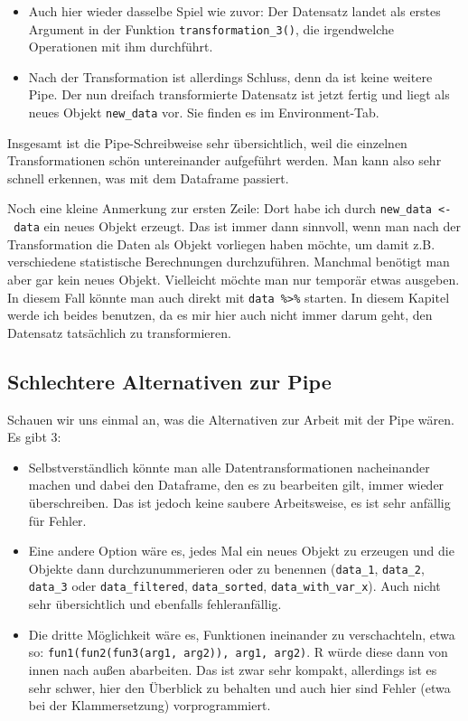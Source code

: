 \documentclass[
]{book}
\begin{document}
\begin{enumerate}
  \begin{itemize}
  \item
    Auch hier wieder dasselbe Spiel wie zuvor: Der Datensatz landet als erstes Argument in der Funktion \texttt{transformation\_3()}, die irgendwelche Operationen mit ihm durchführt.
  \item
    Nach der Transformation ist allerdings Schluss, denn da ist keine weitere Pipe. Der nun dreifach transformierte Datensatz ist jetzt fertig und liegt als neues Objekt \texttt{new\_data} vor. Sie finden es im Environment-Tab.
  \end{itemize}
\end{enumerate}

Insgesamt ist die Pipe-Schreibweise sehr übersichtlich, weil die einzelnen Transformationen schön untereinander aufgeführt werden. Man kann also sehr schnell erkennen, was mit dem Dataframe passiert.

Noch eine kleine Anmerkung zur ersten Zeile: Dort habe ich durch \texttt{new\_data\ \textless{}-\ data} ein neues Objekt erzeugt. Das ist immer dann sinnvoll, wenn man nach der Transformation die Daten als Objekt vorliegen haben möchte, um damit z.B. verschiedene statistische Berechnungen durchzuführen. Manchmal benötigt man aber gar kein neues Objekt. Vielleicht möchte man nur temporär etwas ausgeben. In diesem Fall könnte man auch direkt mit \texttt{data\ \%\textgreater{}\%} starten. In diesem Kapitel werde ich beides benutzen, da es mir hier auch nicht immer darum geht, den Datensatz tatsächlich zu transformieren.

\hypertarget{schlechtere-alternativen-zur-pipe}{%
\subsection{Schlechtere Alternativen zur Pipe}\label{schlechtere-alternativen-zur-pipe}}

Schauen wir uns einmal an, was die Alternativen zur Arbeit mit der Pipe wären. Es gibt 3:

\begin{itemize}
\item
  Selbstverständlich könnte man alle Datentransformationen nacheinander machen und dabei den Dataframe, den es zu bearbeiten gilt, immer wieder überschreiben. Das ist jedoch keine saubere Arbeitsweise, es ist sehr anfällig für Fehler.
\item
  Eine andere Option wäre es, jedes Mal ein neues Objekt zu erzeugen und die Objekte dann durchzunummerieren oder zu benennen (\texttt{data\_1}, \texttt{data\_2}, \texttt{data\_3} oder \texttt{data\_filtered}, \texttt{data\_sorted}, \texttt{data\_with\_var\_x}). Auch nicht sehr übersichtlich und ebenfalls fehleranfällig.
\item
  Die dritte Möglichkeit wäre es, Funktionen ineinander zu verschachteln, etwa so: \texttt{fun1(fun2(fun3(arg1,\ arg2)),\ arg1,\ arg2)}. R würde diese dann von innen nach außen abarbeiten. Das ist zwar sehr kompakt, allerdings ist es sehr schwer, hier den Überblick zu behalten und auch hier sind Fehler (etwa bei der Klammersetzung) vorprogrammiert.
\end{itemize}
\end{document}
